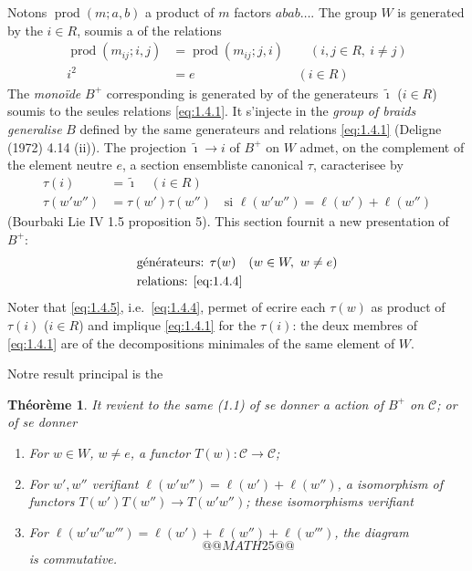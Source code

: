 \documentclass[11pt,a4paper]{article}
\theoremstyle{plain}
\newtheorem{theorem}{Th\'eor\`eme}[section]
\theoremstyle{definition}
\newcommand{\cC}{\mathscr{C}}
\begin{document}
Notons $\operatorname{prod}(m; a, b)$ a product of $m$ factors $abab\ldots$. The group $W$ is generated by the $i \in R$, soumis a of the relations
\begin{align}
\operatorname{prod}(m_{ij}; i, j) &= \operatorname{prod}(m_{ij}; j, i) \qquad (i, j \in R,\ i \not= j) \label{eq:1.4.1} \\
i^2 &= e \qquad\qquad\qquad\qquad (i \in R) \label{eq:1.4.2}
\end{align}
The \emph{mono\"ide} $B^+$ corresponding is generated by of the generateurs $\tilde{\imath}$ ($i \in R$) soumis to the seules relations \eqref{eq:1.4.1}. It s'injecte in the \emph{group of braids generalise} $B$ defined by the same generateurs and relations \eqref{eq:1.4.1} (Deligne (1972) 4.14 (ii)). The projection $\tilde{\imath} \to i$ of $B^+$ on $W$ admet, on the complement of the element neutre $e$, a section ensembliste canonical $\tau$, caracterisee by
\begin{align}
\tau(i) &= \tilde{\imath} \quad (i \in R) \label{eq:1.4.3} \\
\tau(w'w'') &= \tau(w')\tau(w'') \quad \text{si } \ell(w'w'') = \ell(w') + \ell(w'') \label{eq:1.4.4}
\end{align}
(Bourbaki Lie IV 1.5 proposition 5). This section fournit a new presentation of $B^+$:
\begin{align}
&\text{g\'en\'erateurs: } \tau(w) \quad (w \in W,\ w \not= e) \label{eq:1.4.5} \\
&\text{relations: } \eqref{eq:1.4.4} \notag
\end{align}
Noter that \eqref{eq:1.4.5}, i.e.\ \eqref{eq:1.4.4}, permet of ecrire each $\tau(w)$ as product of $\tau(i)$ ($i \in R$) and implique \eqref{eq:1.4.1} for the $\tau(i)$: the deux membres of \eqref{eq:1.4.1} are of the decompositions minimales of the same element of $W$.

Notre result principal is the

\begin{theorem}\label{thm:1.5}
It revient to the same \textup{(1.1)} of se donner a action of $B^+$ on $\cC$; or of se donner
\begin{enumerate}
\item[(1.5.1)] For $w \in W$, $w \not= e$, a functor $T(w) : \cC \to \cC$;
\item[(1.5.2)] For $w', w''$ verifiant $\ell(w'w'') = \ell(w') + \ell(w'')$, a isomorphism of functors $T(w')T(w'') \to T(w'w'')$; these isomorphisms verifiant
\item[(1.5.3)] For $\ell(w'w''w''') = \ell(w') + \ell(w'') + \ell(w''')$, the diagram
\[
@@MATH25@@
\]
is commutative.
\end{enumerate}
\end{theorem}
\end{document}
